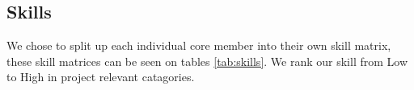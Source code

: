 \subsection{Skills}
We chose to split up each individual core member into their own skill matrix,
these skill matrices can be seen on tables \ref{tab:skills}.
We rank our skill from Low to High in project relevant catagories.

